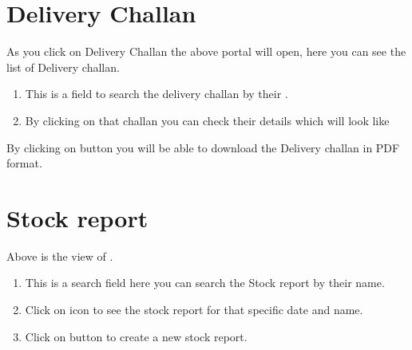 \documentclass[letterpaper,10pt,english]{sphinxmanual}
\begin{document}
\chapter{Delivery Challan}
\label{\detokenize{setting:delivery-challan}}
\begin{figure}[htbp]
\centering

\noindent{}
\end{figure}

As you click on Delivery Challan the above portal will open, here you can see the list of Delivery challan.
\begin{enumerate}
\item {} 
This is a  field to search the delivery challan by their .

\item {} 
By clicking on that challan you can check their details which will look like

\end{enumerate}

\begin{figure}[htbp]
\centering

\noindent{}
\end{figure}

By clicking on  button you will be able to download the Delivery challan in PDF format.


\chapter{Stock report}
\label{\detokenize{setting:stock-report}}
\begin{figure}[htbp]
\centering

\noindent{}
\end{figure}

Above is the view of  .
\begin{enumerate}
\item {} 
This is a search field here you can search the Stock report by their name.

\item {} 
Click on  icon to see the stock report for that specific date and name.

\item {} 
Click on  button to create a new stock report.

\end{enumerate}
\end{document}
